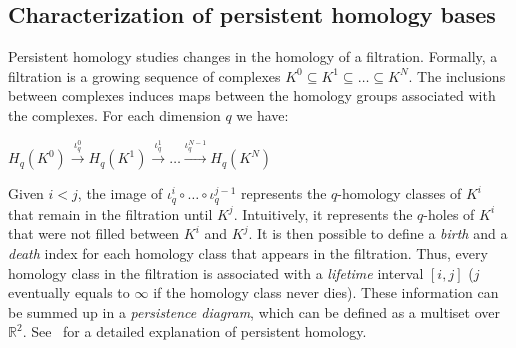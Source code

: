 \documentclass[runningheads]{llncs}
\let\Oldsubsection\subsection
\renewcommand{\subsection}{\FloatBarrier\Oldsubsection}
\DeclareMathOperator{\im}{im}	%
\newcommand{\bs}{\backslash}
\newcommand{\R}{\mathbb{R}}
\begin{document}
\subsection{Characterization of persistent homology bases}\label{sect:persistent-homology}
    Persistent homology studies  changes in the homology of a filtration.
    Formally, a filtration is a growing sequence of complexes $K^0 \subseteq K^1  \subseteq \dots \subseteq K^N $.
    The inclusions between complexes induces maps between the homology groups associated with the complexes.
    For each dimension $q$ we have:
    \begin{center}
        $H_q(K^0) \overset{\iota_q^0}{\longrightarrow} H_q(K^1) \overset{\iota_q^1}{\longrightarrow} \dots \overset{\iota_q^{N-1}}{\longrightarrow} H_q(K^N)$
    \end{center}
    Given $i<j$, the image of $\iota_q^i \circ \dots \circ \iota_q^{j-1}$ represents the $q$-homology classes of $K^i$ that remain in the filtration until $K^j$.
    Intuitively, it represents the $q$-holes of $K^i$ that were not filled between $K^i$ and $K^j$.
    It is then possible to define a \textit{birth} and a \textit{death} index for each homology class that appears in the filtration.
    Thus, every homology class in the filtration is associated with a \textit{lifetime} interval $[i,j]$ ($j$ eventually equals to $\infty$ if the homology class never dies).
    These information can be summed up in a \textit{persistence diagram}, which can be defined as a multiset over $\R^2$.
    See~\cite{edelsbrunner-persistent_homology,zomordian-computing_persistent_homology} for a detailed explanation of persistent homology.

    \medskip
    
\end{document}
